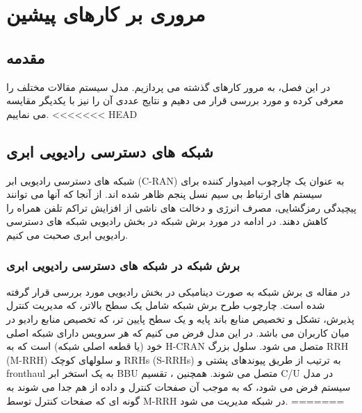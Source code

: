 \chapter{مروری بر کارهای پیشین}

\section{مقدمه}
در این فصل، به مرور کارهای گذشته می پردازیم.
مدل سیستم مقالات مختلف را معرفی کرده و مورد بررسی قرار می دهیم و نتایج عددی آن را نیز با یکدیگر مقایسه می نماییم.
<<<<<<< HEAD
\section{ شبکه های دسترسی رادیویی ابری}
شبکه های دسترسی رادیویی ابر (C-RAN) به عنوان یک چارچوب امیدوار کننده برای سیستم های ارتباط بی سیم نسل پنجم ظاهر شده اند.
از آنجا که آنها می توانند پیچیدگی رمزگشایی، مصرف انرژی و دخالت های ناشی از افزایش تراکم تلفن همراه را کاهش دهند\cite{cranInt}.
در ادامه در مورد برش شبکه در بخش رادیویی شبکه های دسترسی رادیویی ابری صحبت می کنیم.
\subsection{برش شبکه در شبکه های دسترسی رادیویی ابری}
در مقاله ی \cite{lee2018dynamic}
برش شبکه به صورت دینامیکی در بخش رادیویی مورد بررسی قرار گرفته شده است.
چارچوب طرح برش شبکه شامل یک سطح بالاتر، که مدیریت کنترل پذیرش، تشکل و تخصیص منابع باند پایه و یک سطح پایین تر، که تخصیص منابع رادیو در میان کاربران می باشد.
در این مدل فرض می کنیم که هر سرویس دارای شبکه اصلی خود (یا قطعه اصلی شبکه) است که به H-CRAN متصل می شود.
سلول بزرگ RRH (M-RRH) و سلولهای کوچک RRHs (S-RRHs) به ترتیب از طریق پیوندهای پشتی و fronthaul به یک استخر ابر
BBU  متصل می شوند.
همچنین ، تقسیم C/U در مدل سیستم فرض می شود، که به موجب آن صفحات کنترل و داده از هم جدا می شوند به گونه ای که صفحات کنترل توسط M-RRH در شبکه مدیریت می شود.
=======
